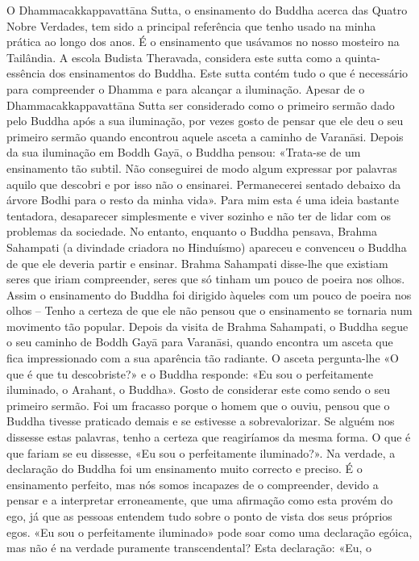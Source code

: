 O Dhammacakkappavattāna Sutta, o ensinamento do
Buddha acerca das Quatro Nobre Verdades, tem sido a principal referência que tenho usado na minha prática ao longo dos
anos. É o ensinamento que usávamos no nosso mosteiro na
Tailândia. A escola Budista Theravada, considera este sutta
como a quinta-essência dos ensinamentos do Buddha. Este
sutta contém tudo o que é necessário para compreender o
Dhamma e para alcançar a iluminação.
Apesar de o Dhammacakkappavattāna Sutta ser considerado como o primeiro sermão dado pelo Buddha após a
sua iluminação, por vezes gosto de pensar que ele deu o seu
primeiro sermão quando encontrou aquele asceta a caminho
de Varanāsi. Depois da sua iluminação em Boddh Gayā, o
Buddha pensou: «Trata-se de um ensinamento tão subtil. Não
conseguirei de modo algum expressar por palavras aquilo que
descobri e por isso não o ensinarei. Permanecerei sentado
debaixo da árvore Bodhi para o resto da minha vida».
Para mim esta é uma ideia bastante tentadora, desaparecer
simplesmente e viver sozinho e não ter de lidar com os problemas da sociedade. No entanto, enquanto o Buddha pensava,
Brahma Sahampati (a divindade criadora no Hinduísmo)
apareceu e convenceu o Buddha de que ele deveria partir e
ensinar. Brahma Sahampati disse-lhe que existiam seres que
iriam compreender, seres que só tinham um pouco de poeira
nos olhos. Assim o ensinamento do Buddha foi dirigido
àqueles com um pouco de poeira nos olhos – Tenho a certeza
de que ele não pensou que o ensinamento se tornaria num
movimento tão popular.
Depois da visita de Brahma Sahampati, o Buddha segue
o seu caminho de Boddh Gayā para Varanāsi, quando encontra
um asceta que fica impressionado com a sua aparência tão
radiante. O asceta pergunta-lhe «O que é que tu descobriste?»
e o Buddha responde: «Eu sou o perfeitamente iluminado, o
Arahant, o Buddha».
Gosto de considerar este como sendo o seu primeiro sermão. Foi um fracasso porque o homem que o ouviu, pensou
que o Buddha tivesse praticado demais e se estivesse a
sobrevalorizar. Se alguém nos dissesse estas palavras, tenho a
certeza que reagiríamos da mesma forma. O que é que fariam
se eu dissesse, «Eu sou o perfeitamente iluminado?».
Na verdade, a declaração do Buddha foi um ensinamento
muito correcto e preciso. É o ensinamento perfeito, mas nós
somos incapazes de o compreender, devido a pensar e a interpretar erroneamente, que uma afirmação como esta provém
do ego, já que as pessoas entendem tudo sobre o ponto de
vista dos seus próprios egos. «Eu sou o perfeitamente iluminado» pode soar como uma declaração egóica, mas não é na
verdade puramente transcendental? Esta declaração: «Eu, o
